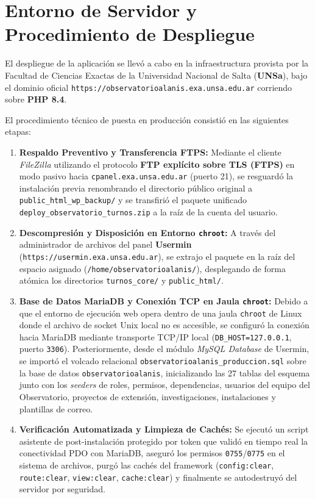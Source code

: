 \section{Entorno de Servidor y Procedimiento de Despliegue}

El despliegue de la aplicación se llevó a cabo en la infraestructura provista por la Facultad de Ciencias Exactas de la Universidad Nacional de Salta (\textbf{UNSa}), bajo el dominio oficial \texttt{https://observatorioalanis.exa.unsa.edu.ar} corriendo sobre \textbf{PHP 8.4}.

El procedimiento técnico de puesta en producción consistió en las siguientes etapas:

\begin{enumerate}
    \item \textbf{Respaldo Preventivo y Transferencia FTPS:} Mediante el cliente \textit{FileZilla} utilizando el protocolo \textbf{FTP explícito sobre TLS (FTPS)} en modo pasivo hacia \texttt{cpanel.exa.unsa.edu.ar} (puerto 21), se resguardó la instalación previa renombrando el directorio público original a \texttt{public\_html\_wp\_backup/} y se transfirió el paquete unificado \texttt{deploy\_observatorio\_turnos.zip} a la raíz de la cuenta del usuario.
    \item \textbf{Descompresión y Disposición en Entorno \texttt{chroot}:} A través del administrador de archivos del panel \textbf{Usermin} (\texttt{https://usermin.exa.unsa.edu.ar}), se extrajo el paquete en la raíz del espacio asignado (\texttt{/home/observatorioalanis/}), desplegando de forma atómica los directorios \texttt{turnos\_core/} y \texttt{public\_html/}.
    \item \textbf{Base de Datos MariaDB y Conexión TCP en Jaula \texttt{chroot}:} Debido a que el entorno de ejecución web opera dentro de una jaula \texttt{chroot} de Linux donde el archivo de socket Unix local no es accesible, se configuró la conexión hacia MariaDB mediante transporte TCP/IP local (\texttt{DB\_HOST=127.0.0.1}, puerto \texttt{3306}). Posteriormente, desde el módulo \textit{MySQL Database} de Usermin, se importó el volcado relacional \texttt{observatorioalanis\_produccion.sql} sobre la base de datos \texttt{observatorioalanis}, inicializando las 27 tablas del esquema junto con los \textit{seeders} de roles, permisos, dependencias, usuarios del equipo del Observatorio, proyectos de extensión, investigaciones, instalaciones y plantillas de correo.
    \item \textbf{Verificación Automatizada y Limpieza de Cachés:} Se ejecutó un script asistente de post-instalación protegido por token que validó en tiempo real la conectividad PDO con MariaDB, aseguró los permisos \texttt{0755}/\texttt{0775} en el sistema de archivos, purgó las cachés del framework (\texttt{config:clear}, \texttt{route:clear}, \texttt{view:clear}, \texttt{cache:clear}) y finalmente se autodestruyó del servidor por seguridad.

\end{enumerate}
